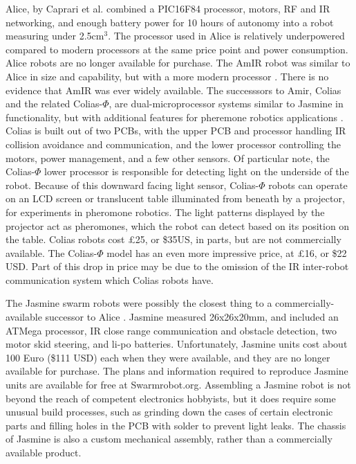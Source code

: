 \documentclass[]{article}
\begin{document}
Alice, by Caprari et al. \cite{caprari1998autonomous} combined a PIC16F84 processor, motors, RF and IR networking, and enough battery power for 10 hours of autonomy into a robot measuring under 2.5cm$^3$. 
The processor used in Alice is relatively underpowered compared to modern processors at the same price point and power consumption. 
Alice robots are no longer available for purchase. 
The AmIR robot was similar to Alice in size and capability, but with a more modern processor \cite{arvin2009development}.
There is no evidence that AmIR was ever widely available.
The successsors to Amir, Colias and the related Colias-$\Phi$, are dual-microprocessor systems similar to Jasmine in functionality, but with additional features for pheremone robotics applications \cite{arvin2014colias, arvin2015colias}. 
Colias is built out of two PCBs, with the upper PCB and processor handling IR collision avoidance and communication, and the lower processor controlling the motors, power management, and a few other sensors.
Of particular note, the Colias-$\Phi$ lower processor is responsible for detecting light on the underside of the robot. 
Because of this downward facing light sensor, Colias-$\Phi$ robots can operate on an LCD screen or translucent table illuminated from beneath by a projector, for experiments in pheromone robotics. 
The light patterns displayed by the projector act as pheromones, which the robot can detect based on its position on the table. 
Colias robots cost \pounds25, or \$35US, in parts, but are not commercially available. 
The Colias-$\Phi$ model has an even more impressive price, at \pounds16, or \$22 USD.
Part of this drop in price may be due to the omission of the IR inter-robot communication system which Colias robots have. 

The Jasmine swarm robots were possibly the closest thing to a commercially-available successor to Alice  \cite{kernbach2011swarmrobot}.
Jasmine measured 26x26x20mm, and included an ATMega processor, IR close range communication and obstacle detection, two motor skid steering, and li-po batteries.
Unfortunately, Jasmine units cost about 100 Euro (\$111 USD) each when they were available, and they are no longer available for purchase. 
The plans and information required to reproduce Jasmine units are available for free at Swarmrobot.org.
Assembling a Jasmine robot is not beyond the reach of competent electronics hobbyists, but it does require some unusual build processes, such as grinding down the cases of certain electronic parts and filling holes in the PCB with solder to prevent light leaks. 
The chassis of Jasmine is also a custom mechanical assembly, rather than a commercially available product. 
\end{document}
